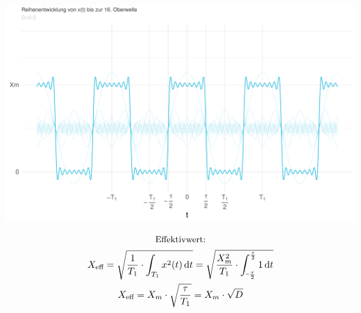 \documentclass[a4paper, 12pt]{article}
\newcommand*\dif{\mathop{}\!\mathrm{d}}
\newcommand*\shortminus{\scalebox{0.5}[1.0]{\( - \)}}
\begin{document}
    \vspace{0.021276873\paperheight}

    \begin{center}
      \includegraphics[scale=0.5]{./R/2_1/2_1_Reihe.pdf}
    \end{center}

    \begin{gather*}
      \text{\small Effektivwert:}\notag\\
      X_{\text{eff}} = \sqrt{ \frac{1}{T_1} \cdot \int_{T_1}{x^2(t) \dif t} } = \sqrt{ \frac{X_m^2}{T_1} \cdot \int_{\shortminus\frac{\tau}{2}}^{\frac{\tau}{2}}{1 \dif t} }\\
      X_{\text{eff}}= X_m \cdot \sqrt{\frac{\tau}{T_1}} = X_m \cdot \sqrt{D}
    \end{gather*}

\end{document}
